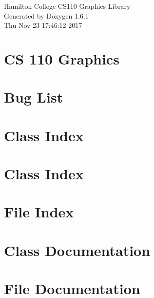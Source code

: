 \documentclass[a4paper]{book}
\begin{document}
\hypersetup{pageanchor=false}
\begin{titlepage}
\vspace*{7cm}
\begin{center}
{\Large Hamilton College CS110 Graphics Library }\\
\vspace*{1cm}
{\large Generated by Doxygen 1.6.1}\\
\vspace*{0.5cm}
{\small Thu Nov 23 17:46:12 2017}\\
\end{center}
\end{titlepage}
\clearemptydoublepage
{}
\tableofcontents
\clearemptydoublepage
{}
\hypersetup{pageanchor=true}
\chapter{CS 110 Graphics}
\label{index}\hypertarget{index}{}
\chapter{Bug List}
\label{bug}
\hypertarget{bug}{}

\chapter{Class Index}

\chapter{Class Index}

\chapter{File Index}

\chapter{Class Documentation}


















\chapter{File Documentation}

\printindex
\end{document}
